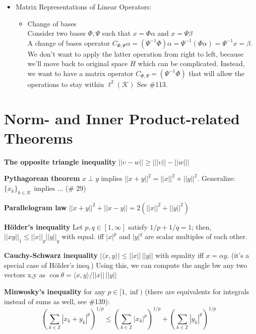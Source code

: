 \documentclass{article}
\newcommand{\la}{\langle}
\newcommand{\ra}{\rangle}
\begin{document}
\begin{itemize}
 	\item Matrix Representations of Linear Operators:
 	\begin{itemize}
 		\item Change of bases \\
 		{\footnotesize\color{gray}
 		Consider two bases $\Phi, \Psi$ such that $x=\Phi\alpha$ and $x=\Psi\beta$\\
 		A change of bases operator $C_{\Phi,\Psi}\alpha=(\Psi^{-1}\Phi)\alpha=\Psi^{-1}(\Phi\alpha)=\Psi^{-1}x=\beta$. \\
 		We don't want to apply the latter operation from right to left, because we'll move back to original space $H$ which can be complicated. Instead, we want to have a matrix operator $C_{\Phi,\Psi}=(\Psi^{-1}\Phi)$ that will allow the operations to stay within $\ell^2(\mathcal{K})$ See \#113. }
 	\end{itemize}

\end{itemize}

















\section{Norm- and Inner Product-related Theorems}
\label{nomr_thms}
\textbf{The opposite triangle inequality}
$||\upsilon-w||\ge \big| ||\upsilon||-||w|| \big|$ 

\textbf{Pythagorean theorem}
$x\perp y$ implies $||x+y||^2=||x||^2+||y||^2$. Generalize: $\{x_k\}_{k\in \mathcal{K}}$ implies ... (\# 29)

\textbf{Parallelogram law} $||x+y||^2+||x-y||=2(||x||^2+||y||^2)$

\textbf{H\"older's inequality} Let $p,q\in [1,\infty]$ satisfy $1/p+1/q=1$; then, $||xy||_1 \le ||x||_p ||y||_q$ with equal. iff $|x|^p$ and $|y|^q$ are scalar multiples of each other.

\textbf{Cauchy-Schwarz inequality} $|\la x,y\ra|\le ||x||\, ||y||$ with equality iff $x=\alpha y$. (it's a special case of H\"older's ineq.) Using this, we can compute the angle bw any two vectors x,y as $\cos \theta = \la x,y \ra/||x||\,||y||$

\textbf{Minwosky's inequality} for any $p\in [1,\inf)$ (there are equivalents for integrals instead of sums as well, see \#139):
\begin{equation}
\left(\sum\limits_{k\in\mathbb{Z}}|x_k+y_k|^p \right)^{1/p} \le \left(\sum\limits_{k\in\mathbb{Z}}|x_k|^p \right)^{1/p}+\left(\sum\limits_{k\in\mathbb{Z}}|y_k|^p \right)^{1/p}
\end{equation}
\end{document}
